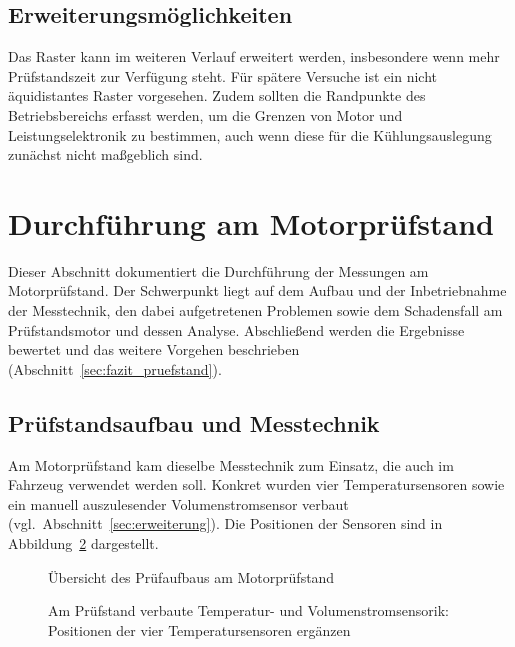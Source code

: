 \subsection{Erweiterungsmöglichkeiten}

Das Raster kann im weiteren Verlauf erweitert werden, insbesondere wenn mehr
Prüfstandszeit zur Verfügung steht. Für spätere Versuche ist ein nicht
äquidistantes Raster vorgesehen. Zudem sollten die Randpunkte des Betriebsbereichs
erfasst werden, um die Grenzen von Motor und Leistungselektronik zu bestimmen,
auch wenn diese für die Kühlungsauslegung zunächst nicht maßgeblich sind.

 
\section{Durchführung am Motorprüfstand}
\label{sec:durchfuehrung}
 

Dieser Abschnitt dokumentiert die Durchführung der Messungen am Motorprüfstand. Der Schwerpunkt liegt auf dem Aufbau und der Inbetriebnahme der Messtechnik, den dabei aufgetretenen Problemen sowie dem Schadensfall am Prüfstandsmotor und dessen Analyse. Abschließend werden die Ergebnisse bewertet und das weitere Vorgehen beschrieben (Abschnitt~\ref{sec:fazit_pruefstand}).

\subsection{Prüfstandsaufbau und Messtechnik}
\label{sec:pruefstandsaufbau}

Am Motorprüfstand kam dieselbe Messtechnik zum Einsatz, die auch im Fahrzeug verwendet werden soll. Konkret wurden vier Temperatursensoren sowie ein manuell auszulesender Volumenstromsensor verbaut (vgl.\ Abschnitt~\ref{sec:erweiterung}). Die Positionen der Sensoren sind in Abbildung~\ref{fig:pruefstand_sensorik} dargestellt.

\begin{figure}[htbp]
    \centering
    \caption{Übersicht des Prüfaufbaus am Motorprüfstand}
    \label{fig:pruefstand_uebersicht}
\end{figure}

\begin{figure}[htbp]
    \centering
    \caption{Am Prüfstand verbaute Temperatur- und Volumenstromsensorik: Positionen der vier Temperatursensoren ergänzen}
    \label{fig:pruefstand_sensorik}
\end{figure}

